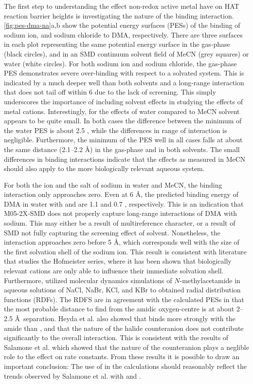 The first step to understanding the effect non-redox active metal have on HAT
reaction barrier heights is investigating the nature of the binding
interaction. \ref{fig:pes-dma-na}a,b show the potential energy surfaces (PESs)
of the binding of sodium ion, and sodium chloride to DMA, respectively. There
are three surfaces in each plot representing the same potential energy surface
in the gas-phase (black circles), and in an SMD\cite{Marenich2009} continuum
solvent field of MeCN (grey squares) or water (white circles). For both sodium
ion and sodium chloride, the gas-phase PES demonstrates severe over-binding
with respect to a solvated system. This is indicated by a much deeper well than
both solvents and a long-range interaction that does not tail off within 6
\kcalmol due to the lack of screening. This simply underscores the importance
of including solvent effects in studying the effects of metal cations.
Interestingly, for the effects of water compared to MeCN solvent appears to be
quite small. In both cases the difference between the minimum of the water PES
is about 2.5 \kcalmol, while the differences in range of interaction is
negligible. Furthermore, the minimum of the PES well in all cases falls at
about the same distance (2.1--2.2 \AA) in the gas-phase and in both solvents.
The small differences in binding interactions indicate that the effects as
measured in MeCN should also apply to the more biologically relevant aqueous
system. 

For both the ion and the salt of sodium in water and MeCN, the binding
interaction only approaches zero. Even at 6 \AA, the predicted binding energy
of DMA in water with  and  are 1.1 and 0.7 \kcalmol,
respectively. This is an indication that M05-2X-SMD does not properly capture
long-range interactions of DMA with sodium. This may either be a result of
multireference character, or a result of SMD not fully capturing the screening
effect of solvent. Nonetheless, the interaction approaches zero before 5 \AA,
which corresponds well with the size of the first solvation shell of the sodium
ion.\cite{Degreve1996} This result is consistent with literature that studies
the Hofmeister series, where it has been shown that biologically relevant
cations are only able to influence their immediate solvation
shell.\cite{Omta2003, Funkner2011} Furthermore, \citet{Heyda2009} utilized
molecular dynamics simulations of $N$-methylacetamide in aqueous solutions of
NaCl, NaBr, KCl, and KBr to obtained radial distribution functions (RDFs). The
RDFS are in agreement with the calculated PESs in that the most probable
distance to find  from the amidic oxygen-centre is at about 2--2.5
\AA\ separation. Heyda et al. also showed that  binds more strongly
with the amide than , and that the nature of the halide counteranion
does not contribute significantly to the overall interaction. This is
consistent with the results of Salamone et al. which showed that the nature of
the counteranion plays a neglible role to the effect on rate
constants.\cite{Salamone2013a} From these results it is possible to draw an
important conclusion: The use of  in the calculations should
reasonably reflect the trends observed by Salamone et al.  with  and
.

